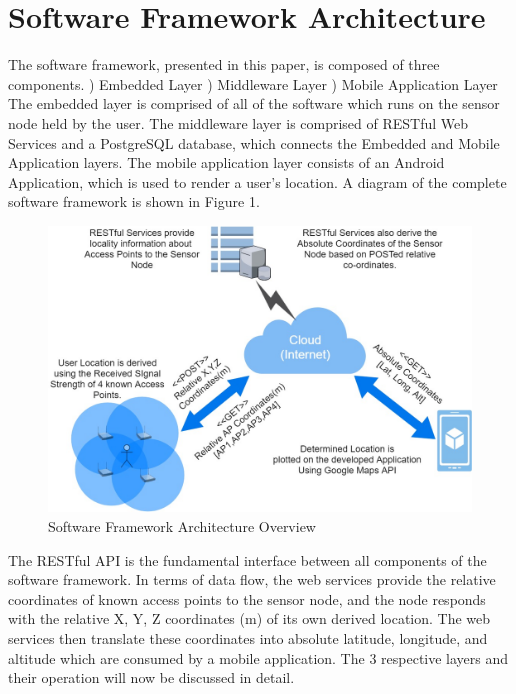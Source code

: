 \documentclass[conference]{IEEEtran}
\begin{document}
\section{Software Framework Architecture}
The software framework, presented in this paper, is composed of three components.
) Embedded Layer
) Middleware Layer
) Mobile Application Layer
\newline
The embedded layer is comprised of all of the software which runs on the sensor node held by the user.
The middleware layer is comprised of RESTful Web Services and a PostgreSQL database, which connects the Embedded and Mobile Application layers.
The mobile application layer consists of an Android Application, which is used to render a user's location.
A diagram of the complete software framework is shown in Figure 1.
\begin{figure}[H]
    \includegraphics[width=9 cm,height=5.5 cm]{System_Diagram.jpg}
    \caption{Software Framework Architecture Overview}
    \end{figure}
The RESTful API is the fundamental interface between all components of the software framework. In terms of data flow, the web services provide the relative coordinates of known access points to the sensor node, and the node responds with the relative X, Y, Z coordinates (m) of its own derived location. The web services then translate these coordinates into absolute latitude, longitude, and altitude which are consumed by a mobile application.
The 3 respective layers and their operation will now be discussed in detail.
\end{document}
